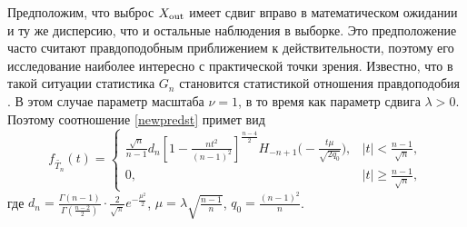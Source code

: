 Предположим, что  выброс $X_{\rm out}$ имеет сдвиг вправо в математическом ожидании и  ту же дисперсию, что и остальные наблюдения в выборке. Это предположение часто считают правдоподобным приближением к действительности, поэтому его исследование  наиболее интересно с практической точки зрения. Известно, что в такой ситуации статистика $G_n$ становится статистикой отношения правдоподобия \cite{Bar}.
 В этом случае параметр масштаба \mbox{$\nu=1$}, в то время как параметр сдвига $\lambda>0$. Поэтому  соотношение  \eqref{newpredst} примет вид
\begin{equation}\label{newpredst1}
f_{\tilde{T_n}}(t)=
\left\{
    \begin{array}{cr}
\frac{\sqrt{n}}{n-1}d_n
\left[1-\frac{nt^2}{(n-1)^2}\right]^{\frac{n-4}{2}}
H_{-n+1}\bigl(-\frac{t\mu}{\sqrt{2q_0}}\bigr),& |t|<\frac{n-1}{\sqrt{n}},\\
     0 , &|t|\ge\frac{n-1}{\sqrt{n}},
    \end{array}
\right.
\end{equation}
где
$d_n=\frac{\Gamma(n-1)}{\Gamma\left(\frac{n-2}{2}\right)}
\cdot \frac{2}{\sqrt{\pi}}e^{-\frac{\mu^2}{2}}$, $\mu=\lambda\sqrt{\frac{n-1}{n}}$, $q_0=\frac{(n-1)^2}{n}$.



